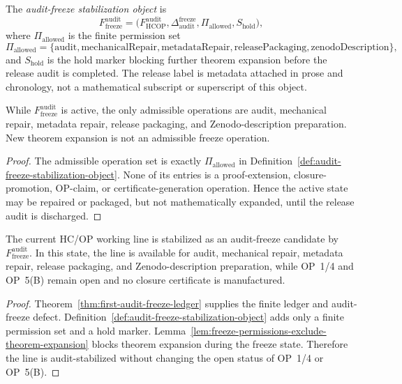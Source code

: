 \begin{definition}
\label{def:audit-freeze-stabilization-object}
The \emph{audit-freeze stabilization object} is
\[
  F_{\mathrm{freeze}}^{\mathrm{audit}}
  =
  \bigl(
    F_{\mathrm{HCOP}}^{\mathrm{audit}},
    \Delta_{\mathrm{audit}}^{\mathrm{freeze}},
    \Pi_{\mathrm{allowed}},
    S_{\mathrm{hold}}
  \bigr),
\]
where \(\Pi_{\mathrm{allowed}}\) is the finite permission set
\[
  \Pi_{\mathrm{allowed}}
  =
  \{\mathrm{audit},\mathrm{mechanicalRepair},\mathrm{metadataRepair},
    \mathrm{releasePackaging},\mathrm{zenodoDescription}\},
\]
and \(S_{\mathrm{hold}}\) is the hold marker blocking further theorem expansion before the release audit is completed.  The release label is metadata attached in prose and chronology, not a mathematical subscript or superscript of this object.
\end{definition}

\begin{lemma}
\label{lem:freeze-permissions-exclude-theorem-expansion}
While \(F_{\mathrm{freeze}}^{\mathrm{audit}}\) is active, the only admissible operations are audit, mechanical repair, metadata repair, release packaging, and Zenodo-description preparation.  New theorem expansion is not an admissible freeze operation.
\end{lemma}

\begin{proof}
The admissible operation set is exactly \(\Pi_{\mathrm{allowed}}\) in Definition~\ref{def:audit-freeze-stabilization-object}.  None of its entries is a proof-extension, closure-promotion, OP-claim, or certificate-generation operation.  Hence the active state may be repaired or packaged, but not mathematically expanded, until the release audit is discharged.
\end{proof}

\begin{theorem}
\label{thm:audit-freeze-stabilization}
The current HC/OP working line is stabilized as an audit-freeze candidate by \(F_{\mathrm{freeze}}^{\mathrm{audit}}\).  In this state, the line is available for audit, mechanical repair, metadata repair, release packaging, and Zenodo-description preparation, while OP~1/4 and OP~5(B) remain open and no closure certificate is manufactured.
\end{theorem}

\begin{proof}
Theorem~\ref{thm:first-audit-freeze-ledger} supplies the finite ledger and audit-freeze defect.  Definition~\ref{def:audit-freeze-stabilization-object} adds only a finite permission set and a hold marker.  Lemma~\ref{lem:freeze-permissions-exclude-theorem-expansion} blocks theorem expansion during the freeze state.  Therefore the line is audit-stabilized without changing the open status of OP~1/4 or OP~5(B).
\end{proof}

